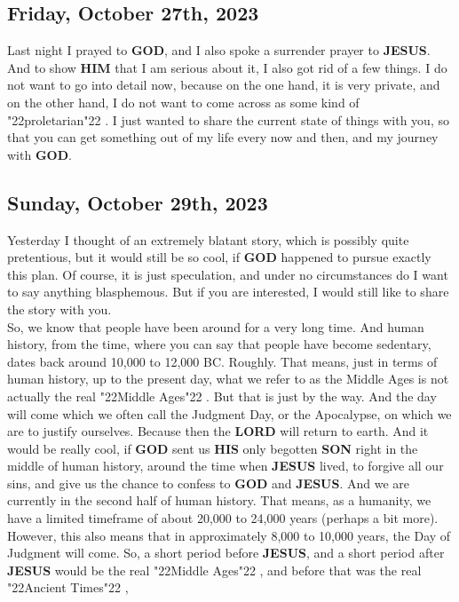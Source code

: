 \documentclass[12pt,a5paper]{article}
\newcommand{\God}[0]{\textbf{GOD}}
\newcommand{\Him}[0]{\textbf{HIM}}
\newcommand{\His}[0]{\textbf{HIS}}
\newcommand{\Jesus}[0]{\textbf{JESUS}}
\newcommand{\Lord}[0]{\textbf{LORD}}
\newcommand{\Son}[0]{\textbf{SON}}
\newcommand{\q}[1]{\char"22{#1}\char"22 }
\begin{document}
	\subsection{Friday, October 27th, 2023}
		Last night I prayed to {\God},
		and I also spoke a surrender prayer to {\Jesus}.
		And to show {\Him} that I am serious about it,
		I also got rid of a few things.
		I do not want to go into detail now,
		because on the one hand,
		it is very private,
		and on the other hand,
		I do not want to come across as some kind of \q{proletarian}.
		I just wanted to share the current state of things with you,
		so that you can get something out of my life every now and then,
		and my journey with {\God}.
		
	\subsection{Sunday, October 29th, 2023}
		Yesterday I thought of an extremely blatant story,
		which is possibly quite pretentious,
		but it would still be so cool,
		if {\God} happened to pursue exactly this plan.
		Of course,
		it is just speculation,
		and under no circumstances do I want to say anything blasphemous.
		But if you are interested,
		I would still like to share the story with you.
		\\
		So,
		we know that people have been around for a very long time.
		And human history,
		from the time,
		where you can say
		that people have become sedentary,
		dates back around 10,000 to 12,000 BC.
		Roughly.
		That means,
		just in terms of human history,
		up to the present day,
		what we refer to as the Middle Ages is not actually the real \q{Middle Ages}.
		But that is just by the way.
		And the day will come
		which we often call the Judgment Day,
		or the Apocalypse,
		on which we are to justify ourselves.
		Because then the {\Lord} will return to earth.
		And it would be really cool,
		if {\God} sent us {\His} only begotten {\Son} right in the middle of human history,
		around the time when {\Jesus} lived,
		to forgive all our sins,
		and give us the chance to confess to {\God} and {\Jesus}.
		And we are currently in the second half of human history.
		That means,
		as a humanity,
		we have a limited timeframe of about 20,000 to 24,000 years
		(perhaps a bit more).
		However,
		this also means that in approximately 8,000 to 10,000 years,
		the Day of Judgment will come.
		So,
		a short period before {\Jesus},
		and a short period after {\Jesus} would be the real \q{Middle Ages},
		and before that was the real \q{Ancient Times},
\end{document}
